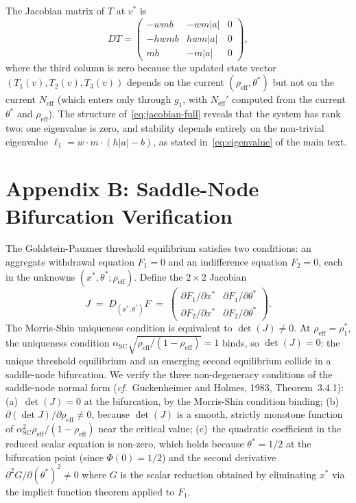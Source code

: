The Jacobian matrix of $T$ at $v^*$ is
\begin{equation}\label{eq:jacobian-full}
  DT = \begin{pmatrix} -wmb & -wm|a| & 0 \\ -hwmb & hwm|a| & 0 \\ mb & -m|a| & 0 \end{pmatrix},
\end{equation}
where the third column is zero because the updated state vector $(T_1(v), T_2(v), T_3(v))$ depends on the current $(\rho_{\text{eff}}, \theta^*)$ but not on the current $N_{\text{eff}}$ (which enters only through $g_1$, with $N_{\text{eff}}'$ computed from the current $\theta^*$ and $\rho_{\text{eff}}$). The structure of~\eqref{eq:jacobian-full} reveals that the system has rank two: one eigenvalue is zero, and stability depends entirely on the non-trivial eigenvalue $\ell_1 = w \cdot m \cdot (h|a| - b)$, as stated in~\eqref{eq:eigenvalue} of the main text.

\section*{Appendix B: Saddle-Node Bifurcation Verification}\label{app:saddle-node}

The Goldstein-Pauzner threshold equilibrium satisfies two conditions: an aggregate withdrawal equation $F_1 = 0$ and an indifference equation $F_2 = 0$, each in the unknowns $(x^*, \theta^*; \rho_{\text{eff}})$. Define the $2\times 2$ Jacobian
\begin{equation}\label{eq:h-divergence}
  J \;=\; D_{(x^*,\theta^*)}F \;=\; \begin{pmatrix} \partial F_1/\partial x^* & \partial F_1/\partial \theta^* \\ \partial F_2/\partial x^* & \partial F_2/\partial \theta^* \end{pmatrix}.
\end{equation}
The Morris-Shin uniqueness condition is equivalent to $\det(J) \neq 0$. At $\rho_{\text{eff}} = \rho_1^*$, the uniqueness condition $\alpha_{\text{SC}}\sqrt{\rho_{\text{eff}}/(1-\rho_{\text{eff}})} = 1$ binds, so $\det(J) = 0$: the unique threshold equilibrium and an emerging second equilibrium collide in a saddle-node bifurcation. We verify the three non-degeneracy conditions of the saddle-node normal form (\emph{cf.}\ Guckenheimer and Holmes, 1983, Theorem~3.4.1):
(a)~$\det(J) = 0$ at the bifurcation, by the Morris-Shin condition binding;
(b)~$\partial(\det J)/\partial \rho_{\text{eff}} \neq 0$, because $\det(J)$ is a smooth, strictly monotone function of $\alpha_{\text{SC}}^2\rho_{\text{eff}}/(1-\rho_{\text{eff}})$ near the critical value;
(c)~the quadratic coefficient in the reduced scalar equation is non-zero, which holds because $\theta^* = 1/2$ at the bifurcation point (since $\Phi(0) = 1/2$) and the second derivative $\partial^2 G/\partial(\theta^*)^2 \neq 0$ where $G$ is the scalar reduction obtained by eliminating $x^*$ via the implicit function theorem applied to $F_1$.


